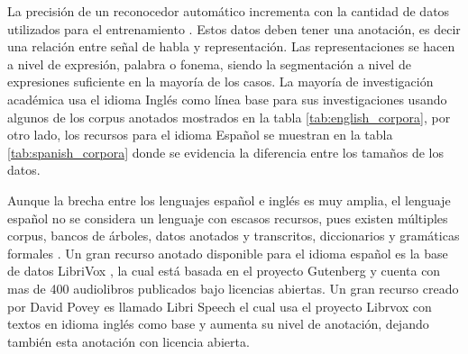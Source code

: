 La precisión de un reconocedor automático incrementa con la cantidad de datos utilizados para el entrenamiento \cite{MooreAListeners}. Estos datos deben tener una anotación, es decir una relación entre señal de habla y representación. Las representaciones se hacen a nivel de expresión, palabra o fonema, siendo la segmentación a nivel de expresiones suficiente en la mayoría de los casos. La mayoría de investigación académica usa el idioma Inglés como línea base para sus investigaciones usando algunos de los corpus anotados mostrados en la tabla \ref{tab:english_corpora}, por otro lado, los recursos para el idioma Español se muestran en la tabla \ref{tab:spanish_corpora} donde se evidencia la diferencia entre los tamaños de los datos.





Aunque la brecha entre los lenguajes español e inglés es muy amplia, el lenguaje español no se considera un lenguaje con escasos recursos, pues existen múltiples corpus, bancos de árboles, datos anotados y transcritos, diccionarios y gramáticas formales \cite{CavarGlobalGORILLA}. Un gran recurso anotado disponible para el idioma español es la base de datos LibriVox  \cite{LibriVox}, la cual está basada en el proyecto Gutenberg \cite{gutenberg} y cuenta con mas de 400 audiolibros publicados bajo licencias abiertas. Un gran recurso creado por David Povey es llamado Libri Speech \cite{PanayotovLIBRISPEECH:BOOKS} el cual usa el proyecto Librvox con textos en idioma inglés como base y aumenta su nivel de anotación, dejando también esta anotación con licencia abierta.

